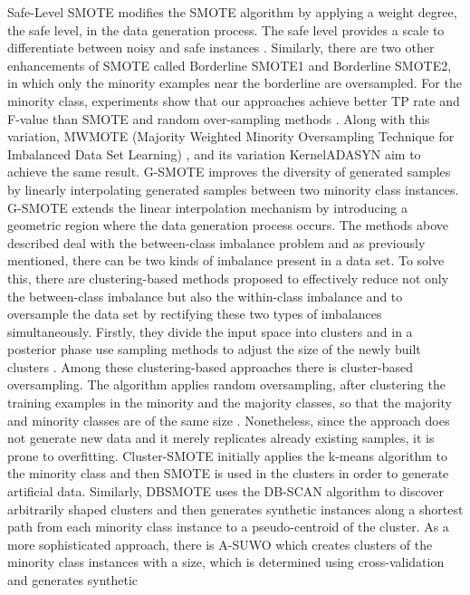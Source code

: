 \documentclass[parskip=full]{scrartcl}
\begin{document}
Safe-Level SMOTE modifies the SMOTE algorithm by applying a weight degree, the
safe level, in the data generation process. The safe level provides a scale to
differentiate between noisy and safe instances \cite{Bunk2009}. Similarly, there
are two other enhancements of SMOTE called Borderline SMOTE1 and Borderline
SMOTE2, in which only the minority examples near the borderline are oversampled.
For the minority class, experiments show that our approaches achieve better TP
rate and F-value than SMOTE and random over-sampling methods \cite{Han2005}.
Along with this variation, MWMOTE (Majority Weighted Minority Oversampling
Technique for Imbalanced Data Set Learning) \cite{Barua2014}, and its variation
KernelADASYN \cite{Tang2015} aim to achieve the same result. G-SMOTE
\cite{Douzas2019} improves the diversity of generated samples by linearly
interpolating generated samples between two minority class instances. G-SMOTE
extends the linear interpolation mechanism by introducing a geometric region
where the data generation process occurs. The methods above described deal with
the between-class imbalance problem and as previously mentioned, there can be
two kinds of imbalance present in a data set. To solve this, there are
clustering-based methods proposed to effectively reduce not only the
between-class imbalance but also the within-class imbalance and to oversample
the data set by rectifying these two types of imbalances simultaneously.
Firstly, they divide the input space into clusters and in a posterior phase use
sampling methods to adjust the size of the newly built clusters
\cite{Douzas2017a} \cite{Jo2004}. Among these clustering-based approaches there
is cluster-based oversampling. The algorithm applies random oversampling, after
clustering the training examples in the minority and the majority classes, so
that the majority and minority classes are of the same size \cite{Jo2004}.
Nonetheless, since the approach does not generate new data and it merely
replicates already existing samples, it is prone to overfitting. Cluster-SMOTE
\cite{Cieslak2006} initially applies the k-means algorithm to the minority class
and then SMOTE is used in the clusters in order to generate artificial data.
Similarly, DBSMOTE \cite{Bunkhumpornpat2012} uses the DB-SCAN algorithm to
discover arbitrarily shaped clusters and then generates synthetic instances
along a shortest path from each minority class instance to a pseudo-centroid of
the cluster. As a more sophisticated approach, there is A-SUWO
\cite{Nekooeimehr2016} which creates clusters of the minority class instances
with a size, which is determined using cross-validation and generates synthetic
\end{document}
